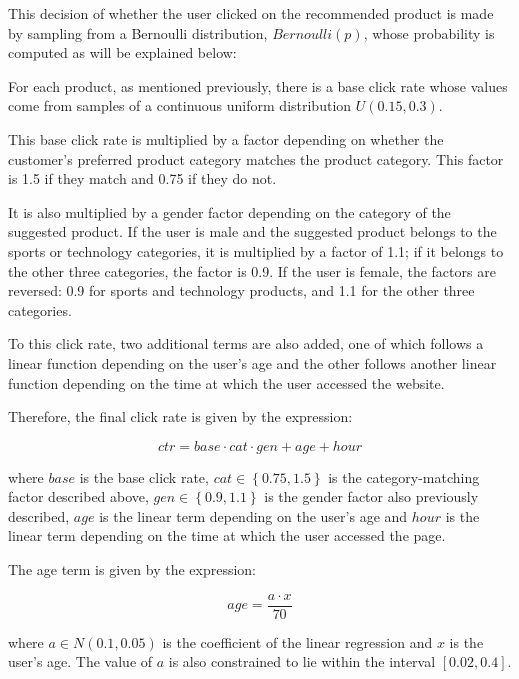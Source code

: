 \documentclass[../main.tex]{subfiles}
\begin{document}
This decision of whether the user clicked on the recommended product is made by sampling 
from a Bernoulli distribution, $Bernoulli\left(p\right)$, whose probability is computed 
as will be explained below:  

For each product, as mentioned previously, there is a base click rate whose values come 
from samples of a continuous uniform distribution $U\left(0.15, 0.3\right)$.  

This base click rate is multiplied by a factor depending on whether the customer’s preferred 
product category matches the product category. This factor is 1.5 if they match and 0.75 if 
they do not.  

It is also multiplied by a gender factor depending on the category of the suggested product. 
If the user is male and the suggested product belongs to the sports or technology categories, 
it is multiplied by a factor of 1.1; if it belongs to the other three categories, the factor 
is 0.9. If the user is female, the factors are reversed: 0.9 for sports and technology products, 
and 1.1 for the other three categories.  

To this click rate, two additional terms are also added, one of which follows a linear 
function depending on the user’s age and the other follows another linear function depending on 
the time at which the user accessed the website.  

Therefore, the final click rate is given by the expression:  

\begin{equation*}
    ctr = base \cdot cat \cdot gen + age + hour
\end{equation*}

where $base$ is the base click rate, $cat \in \left\lbrace 0.75 ,1.5\right\rbrace$ is the 
category-matching factor described above, $gen \in \left\lbrace 0.9 ,1.1\right\rbrace$ is the 
gender factor also previously described, $age$ is the linear term depending on the user’s age 
and $hour$ is the linear term depending on the time at which the user accessed the page.  

The age term is given by the expression:  

\begin{equation*}
    age= \dfrac{a \cdot x}{70}
\end{equation*}

where $a \in N\left(0.1, 0.05\right)$ is the coefficient of the linear regression and $x$ is the 
user’s age. The value of $a$ is also constrained to lie within the interval $\left[0.02, 0.4\right]$.  
\end{document}
